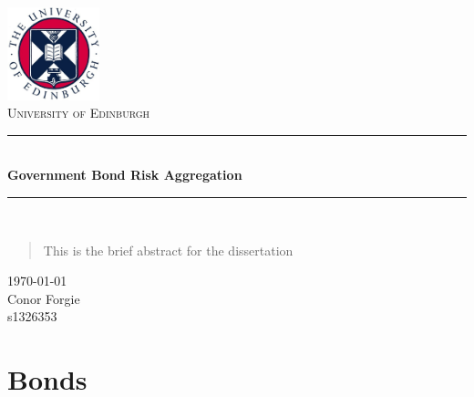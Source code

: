 \documentclass[12pt&a4paper]{article}
\numberwithin{equation}{section}
\begin{document}

\begin{titlepage}

\begin{center}
\includegraphics[width=0.2\textwidth]{edlogo}~\\[1cm] %
\textsc{\LARGE University of Edinburgh}~\\[6.5cm]



\hrule ~\\[0.4cm]
{ \huge \bf Government Bond Risk Aggregation }~\\[0.4cm]
\hrule ~\\[2cm]


\begin{abstract}
	This is the brief abstract for the dissertation
\end{abstract}
\vfill


{\large\today \\
Conor Forgie\\
s1326353

}

\end{center}
\end{titlepage}

\tableofcontents
\newpage
{}



\section{Bonds}
\end{document}
